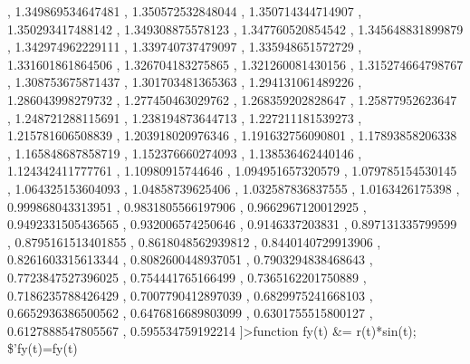 \documentclass[
]{book}
\begin{document}
,   1.349869534647481 , 1.350572532848044 , 1.350714344714907 ,   1.350293417488142 , 1.349308875578123 , 1.347760520854542 ,   1.345648831899879 , 1.342974962229111 , 1.339740737479097 ,   1.335948651572729 , 1.331601861864506 , 1.326704183275865 ,   1.321260081430156 , 1.315274664798767 , 1.308753675871437 ,   1.301703481365363 , 1.294131061489226 , 1.286043998279732 ,   1.277450463029762 , 1.268359202828647 , 1.25877952623647 ,   1.248721288115691 , 1.238194873644713 , 1.227211181539273 ,   1.215781606508839 , 1.203918020976346 , 1.191632756090801 ,   1.17893858206338 , 1.165848687858719 , 1.152376660274093 ,   1.138536462440146 , 1.124342411777761 , 1.10980915744646 ,   1.094951657320579 , 1.079785154530145 , 1.064325153604093 ,   1.04858739625406 , 1.032587836837555 , 1.0163426175398 ,   0.999868043313951 , 0.9831805566197906 , 0.9662967120012925 ,   0.9492331505436565 , 0.932006574250646 , 0.9146337203831 ,   0.897131335799599 , 0.8795161513401855 , 0.8618048562939812 ,   0.8440140729913906 , 0.8261603315613344 , 0.8082600448937051 ,   0.7903294838468643 , 0.7723847527396025 , 0.754441765166499 ,   0.7365162201750889 , 0.7186235788426429 , 0.7007790412897039 ,   0.6829975241668103 , 0.6652936386500562 , 0.6476816689803099 ,   0.6301755515800127 , 0.6127888547805567 , 0.595534759192214 \right]\]\textgreater function fy(t) \&= r(t)*sin(t); \$'fy(t)=fy(t)
\end{document}
